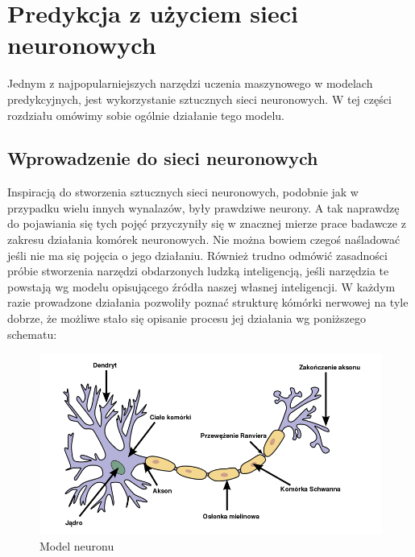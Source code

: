 \documentclass[10pt,a4paper]{book}
\begin{document}
\section{Predykcja z użyciem sieci neuronowych}

Jednym z najpopularniejszych narzędzi uczenia maszynowego w modelach predykcyjnych, jest wykorzystanie sztucznych sieci neuronowych. W tej części rozdziału omówimy sobie ogólnie działanie tego modelu.

\subsection{Wprowadzenie do sieci neuronowych}

Inspiracją do stworzenia sztucznych sieci neuronowych, podobnie jak w przypadku wielu innych wynalazów, były prawdziwe neurony. A tak naprawdzę do pojawiania się tych pojęć przyczyniły się w znacznej mierze prace badawcze z zakresu działania komórek neuronowych. Nie można bowiem czegoś naśladować jeśli nie ma się pojęcia o jego działaniu. Również trudno odmówić zasadności próbie stworzenia narzędzi obdarzonych ludzką inteligencją, jeśli narzędzia te powstają wg modelu opisującego źródła naszej własnej inteligencji. W każdym razie prowadzone działania pozwoliły poznać strukturę kómórki nerwowej na tyle dobrze, że możliwe stało się opisanie procesu jej działania wg poniższego schematu:

\begin{figure}
\centering
\includegraphics[scale=0.5]{images/neuron.png}
\caption{Model neuronu}
\end{figure}
\end{document}
